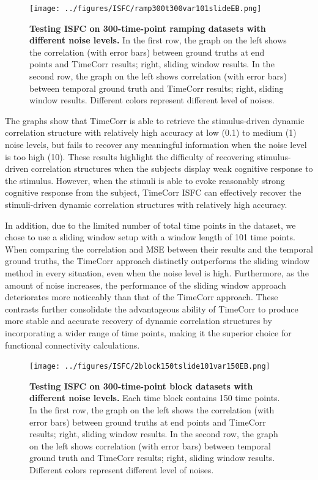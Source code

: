 \documentclass[11pt]{article}
\begin{document}
\begin{enumerate}
\begin{figure}[!htb]
\texttt{[image: ../figures/ISFC/ramp300t300var101slideEB.png]}
\caption{\textbf{Testing ISFC on 300-time-point ramping datasets with different noise levels.} In the first row, the graph on the left shows the correlation (with error bars) between ground truths at end points and TimeCorr results; right, sliding window results. In the second row, the graph on the left shows correlation (with error bars) between temporal ground truth and TimeCorr results; right, sliding window results. Different colors represent different level of noises.}
\label{fig:t300slide25var1000}
\end{figure}

The graphs show that TimeCorr is able to retrieve the stimulus-driven dynamic correlation structure with relatively high accuracy at low (0.1) to medium (1) noise levels, but fails to recover any meaningful information when the noise level is too high (10). These results highlight the difficulty of recovering stimulus-driven correlation structures when the subjects display weak cognitive response to the stimulus. However, when the stimuli is able to evoke reasonably strong cognitive response from the subject, TimeCorr ISFC can effectively recover the stimuli-driven dynamic correlation structures with relatively high accuracy.

In addition, due to the limited number of total time points in the dataset, we chose to use a sliding window setup with a window length of 101 time points. When comparing the correlation and MSE between their results and the temporal ground truths, the TimeCorr approach distinctly outperforms the sliding window method in every situation, even when the noise level is high. Furthermore, as the amount of noise increases, the performance of the sliding window approach deteriorates more noticeably than that of the TimeCorr approach. These contrasts further consolidate the advantageous ability of TimeCorr to produce more stable and accurate recovery of dynamic correlation structures by incorporating a wider range of time points, making it the superior choice for functional connectivity calculations.

\begin{figure}
\texttt{[image: ../figures/ISFC/2block150tslide101var150EB.png]}
\caption{\textbf{Testing ISFC on 300-time-point block datasets with different noise levels.} Each time block contains 150 time points. In the first row, the graph on the left shows the correlation (with error bars) between ground truths at end points and TimeCorr results; right, sliding window results. In the second row, the graph on the left shows correlation (with error bars) between temporal ground truth and TimeCorr results; right, sliding window results. Different colors represent different level of noises.}
\label{fig:t300slide25var159}
\end{figure}


\end{enumerate}
\end{document}
